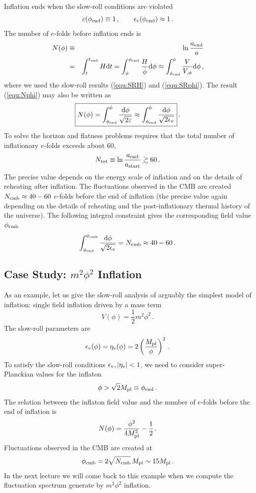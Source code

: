 \documentclass[12pt,letterpaper,rotate]{article}
\def\beq{\begin{equation}}
\def\eeq{\end{equation}}
\def\d{{\rm d}}
\begin{document}
{Inflation ends when the slow-roll conditions %
are violated
\beq
\varepsilon(\phi_{\rm end}) \equiv 1\, , \qquad \epsilon_{\rm v}(\phi_{\rm end}) \approx 1\, .
\eeq
The number of $e$-folds before inflation ends is
\begin{eqnarray}
N(\phi) &\equiv& \ln \frac{a_{\rm end}}{a} \nonumber\\
&=&\int_t^{t_{\rm end}} H \d t = \int_\phi^{\phi_{\rm end}} \frac{H}{\dot \phi} \d \phi 
\approx \int_{\phi_{\rm end}}^\phi \frac{V}{V_{,\phi}} \d \phi \, , \label{equ:Nphi}
\end{eqnarray}
where we used the slow-roll results (\ref{equ:SRH}) and (\ref{equ:SRphi}).
The result (\ref{equ:Nphi}) may also be written as
\beq
\fbox{$\displaystyle
N(\phi) = \int_{\phi_{\rm end}}^\phi \frac{\d \phi}{\sqrt{2\varepsilon}}  \approx \int_{\phi_{\rm end}}^\phi \frac{\d \phi}{\sqrt{2\epsilon_{\rm v}}} $}\, .
\eeq
To solve the horizon and flatness problems requires that the total number of inflationary $e$-folds exceeds about 60,
\beq
N_{\rm tot} \equiv \ln \frac{a_{\rm end}}{a_{\rm start}} \gtrsim 60\, .
\eeq
The precise value depends on the energy scale of inflation and on the details of reheating after inflation.
The fluctuations observed in the CMB are created $N_{\rm cmb} \approx 40-60$ $e$-folds before the end of inflation (the precise value again depending on the details of reheating and the post-inflationary thermal history of the universe). The following integral constraint gives the corresponding field value $\phi_{\rm cmb}$ 
\beq
 \int_{\phi_{\rm end}}^{\phi_{\rm cmb}} \frac{\d \phi}{\sqrt{2\epsilon_{\rm v}}} = N_{\rm cmb} \approx 40 -60\, .
\eeq


\subsection{Case Study: $m^2 \phi^2$ Inflation}

As an example, let us give the slow-roll analysis of arguably the simplest model of inflation:
single field inflation driven by a mass term
\beq
V(\phi) = \frac{1}{2} m^2 \phi^2\, .
\eeq
The slow-roll parameters are
\beq
\epsilon_{\rm v}(\phi) = \eta_{\rm v}(\phi) = 2 \left( \frac{M_{\rm pl}}{\phi}\right)^2\, .
\eeq
To satisfy the slow-roll conditions $\epsilon_{\rm v}, |\eta_{\rm v}| < 1$, we need to consider super-Planckian values for the inflaton
\beq
\phi > \sqrt{2} M_{\rm pl} \equiv \phi_{\rm end}\, .
\eeq
The relation between the inflaton field value and the number of $e$-folds before the end of inflation is
\beq
N(\phi) = \frac{\phi^2}{4 M_{\rm pl}^2} - \frac{1}{2}\, .
\eeq
Fluctuations observed in the CMB are created at
\beq
\phi_{\rm cmb} = 2 \sqrt{N_{\rm cmb}} \, M_{\rm pl} \sim 15 M_{\rm pl}\, .
\eeq
In the next lecture we will come back to this example when we compute the fluctuation spectrum generate by  $m^2 \phi^2$ inflation.

}
\end{document}
